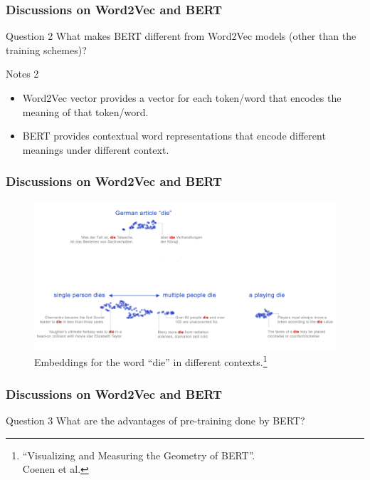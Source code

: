 \documentclass{beamer}
\begin{document}
\begin{frame}
    \frametitle{Discussions on Word2Vec and BERT}
    \begin{block}{Question 2}
        What makes BERT different from Word2Vec models (other than the training schemes)? 
    \end{block}
    
    \begin{block}{Notes 2}
        \begin{itemize}
            \item Word2Vec vector provides a vector for each token/word that encodes the meaning of that token/word. 
            \item BERT provides contextual word representations that encode different meanings under different context.
        \end{itemize}
    \end{block}
\end{frame}

\begin{frame}
    \frametitle{Discussions on Word2Vec and BERT}
    \begin{figure}
        \includegraphics[scale=0.08]{visualize-bert}
        \caption{\footnotesize Embeddings for the word ``die'' in different contexts.\footnote{\tiny ``Visualizing and Measuring the Geometry of BERT''.\\ Coenen et al.}}
    \end{figure}
\end{frame}

\begin{frame}
    \frametitle{Discussions on Word2Vec and BERT}
    \begin{block}{Question 3}
        What are the advantages of pre-training done by BERT? 
    \end{block}
\end{frame}
\end{document}
